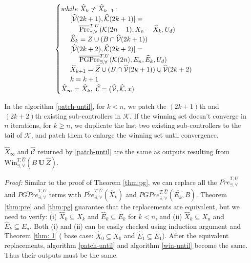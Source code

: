 {\begin{align}
\begin{split}
\begin{cases}
{\color{black} while \ \widehat{X}_{k}\not=\widehat{X}_{k-1}:}\\
\ \ \ \ [\widehat{\mathcal{V}}(2k+1),\widehat{\mathcal{K}}(2k+1)] = \\ \ \ \ \ \ \ \ \ \overline{\text{Pre}}_{\exists,\forall}^{T,U}(\mathcal{K}(2n-1),X_{n}-\widehat{X}_{k}, U_d)\\
\ \ \ \ \widehat{E}_k =  Z\cup (B\cap \widehat{\mathcal{V}}(2k+1))\\
\ \ \ \ [\widehat{\mathcal{V}}(2k+2),\widehat{\mathcal{K}}(2k+2)] =\\ 
\ \ \ \ \ \ \ \ \overline{\text{PGPre}}_{\exists,\forall}^{T,U}(\mathcal{K}(2n),E_n, \widehat{E}_k,U_d)\\
\ \ \ \ \widehat{X}_{k+1} =\widehat{Z}\cup (B\cap \widehat{\mathcal{V}}(2k+1)) \cup \widehat{\mathcal{V}}(2k+2)\\
\ \ \ \ {\color{black} k=k+1}\\
\widehat{X}_\infty = \widehat{X}_k,\ \widehat{\mathcal{C}} = (\widehat{\mathcal{V}},\widehat{\mathcal{K}},x)
\end{cases} \label{patch-until}
\end{split}
\end{align}}

In the algorithm \eqref{patch-until}, for $ k <n $, we patch the $ (2k+1) $th and $ (2k+2) $th existing sub-controllers in $ \mathcal{K} $. If the winning set doesn't converge in $ n $ iterations, for $ k\geq n $, we duplicate the last two existing sub-controllers to the tail of $ \mathcal{K} $, and patch them to enlarge the winning set until convergence. 
\begin{theorem}
	$ \widehat{X}_\infty $ and $ \widehat{\mathcal{C}} $ returned by \eqref{patch-until} are the same as outputs resulting from $ \text{Win}_{\exists,\forall}^{T,\widehat{U}}(B\mathbf{\ U\ }\widehat{Z}). $\label{thm:until}	
\end{theorem}

\emph{Proof:} Similar to the proof of Theorem \ref{thm:pg}, we can replace all the $ \overline{Pre}_{\exists,\forall}^{T,U} $ and $ \overline{PGPre}_{\exists,\forall}^{T,U} $ terms with $ \overline{Pre}_{\exists,\forall}^{T,\widehat{U}}(\widehat{X}_k) $ and $PGPre_{\exists,\forall}^{T,\widehat{U}}(\widehat{E_k},B)$. Theorem \ref{thm:pre} and \ref{thm:pg} guarantee that the replacements are equivalent, but we need to verify: (i) $ \widehat{X}_k \subseteq X_k $ and $ \widehat{E}_k \subseteq E_k $ for $ k < n $, and (ii) $ \widehat{X}_k \subseteq X_n $ and $ \widehat{E}_k \subseteq E_n $. Both (i) and (ii) can be easily checked using induction argument and Theorem \ref{thm: 1} ( base case: $ \widehat{X}_0\subseteq X_0 $ and $ \widehat{E}_1\subseteq E_1 $). After the equivalent replacements, algorithm \eqref{patch-until} and algorithm \eqref{win-until} become the same. Thus their outputs must be the same. \QEDB

